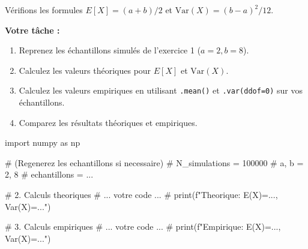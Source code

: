 \begin{exercicebox}
Vérifions les formules $E[X] = (a+b)/2$ et $\text{Var}(X) = (b-a)^2/12$.

\textbf{Votre tâche :}
\begin{enumerate}
    \item Reprenez les échantillons simulés de l'exercice 1 ($a=2, b=8$).
    \item Calculez les valeurs théoriques pour $E[X]$ et $\text{Var}(X)$.
    \item Calculez les valeurs empiriques en utilisant \texttt{.mean()} et \texttt{.var(ddof=0)} sur vos échantillons.
    \item Comparez les résultats théoriques et empiriques.
\end{enumerate}

\begin{codecell}
import numpy as np

# (Regenerez les echantillons si necessaire)
# N_simulations = 100000
# a, b = 2, 8
# echantillons = ...

# 2. Calculs theoriques
# ... votre code ...
# print(f"Theorique: E(X)=..., Var(X)=...")

# 3. Calculs empiriques
# ... votre code ...
# print(f"Empirique: E(X)=..., Var(X)=...")
\end{codecell}
\end{exercicebox}

